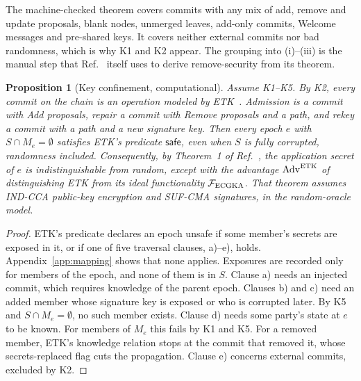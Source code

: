 \documentclass[aps,prx,reprint,superscriptaddress,nofootinbib,floatfix]{revtex4-2}
\newtheorem{proposition}{Proposition}
\theoremstyle{remark}
\newcommand{\roster}{M}
\newcommand{\Adv}{\mathrm{Adv}}
\begin{document}
The machine-checked theorem covers commits with any mix of add, remove and update proposals, blank nodes, unmerged leaves, add-only commits, Welcome messages and pre-shared keys. It covers neither external commits nor bad randomness, which is why K1 and K2 appear. The grouping into (i)--(iii) is the manual step that Ref.~\cite{wallez-thesis} itself uses to derive remove-security from its theorem.

\begin{proposition}[Key confinement, computational]\label{prop:Kcomp}
Assume K1--K5. By K2, every commit on the chain is an operation modeled by ETK~\cite{etk}. Admission is a commit with Add proposals, repair a commit with Remove proposals and a path, and rekey a commit with a path and a new signature key. Then every epoch $e$ with $S\cap\roster_e=\emptyset$ satisfies ETK's predicate $\mathsf{safe}$, even when $S$ is fully corrupted, randomness included. Consequently, by Theorem~1 of Ref.~\cite{etk}, the application secret of $e$ is indistinguishable from random, except with the advantage $\Adv^{\rm ETK}$ of distinguishing ETK from its ideal functionality $\mathcal F_{\rm ECGKA}$. That theorem assumes IND-CCA public-key encryption and SUF-CMA signatures, in the random-oracle model.
\end{proposition}
\begin{proof}
ETK's predicate declares an epoch unsafe if some member's secrets are exposed in it, or if one of five traversal clauses, a)--e), holds. Appendix~\ref{app:mapping} shows that none applies. Exposures are recorded only for members of the epoch, and none of them is in $S$. Clause a) needs an injected commit, which requires knowledge of the parent epoch. Clauses b) and c) need an added member whose signature key is exposed or who is corrupted later. By K5 and $S\cap\roster_e=\emptyset$, no such member exists. Clause d) needs some party's state at $e$ to be known. For members of $\roster_e$ this fails by K1 and K5. For a removed member, ETK's knowledge relation stops at the commit that removed it, whose \textsf{secrets-replaced} flag cuts the propagation. Clause e) concerns external commits, excluded by K2.
\end{proof}
\end{document}
